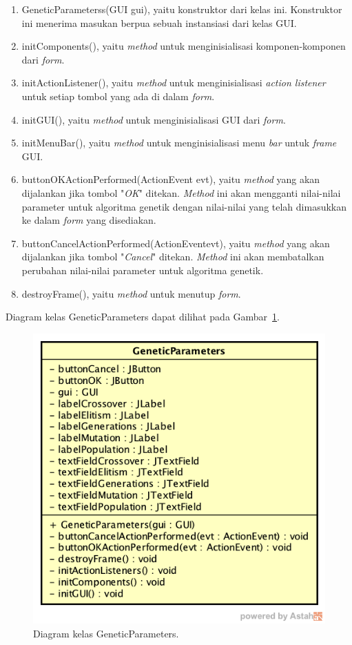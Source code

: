 \begin{enumerate}
\item GeneticParameterss(GUI gui), yaitu konstruktor dari kelas ini. Konstruktor ini menerima masukan berpua sebuah instansiasi dari kelas GUI.
\item initComponents(), yaitu \textit{method} untuk menginisialisasi komponen-komponen dari \textit{form}.
\item initActionListener(), yaitu \textit{method} untuk menginisialisasi \textit{action listener} untuk setiap tombol yang ada di dalam \textit{form}.
\item initGUI(), yaitu \textit{method} untuk menginisialisasi GUI dari \textit{form}.
\item initMenuBar(), yaitu \textit{method} untuk menginisialisasi menu \textit{bar} untuk \textit{frame} GUI.
\item buttonOKActionPerformed(ActionEvent evt), yaitu \textit{method} yang akan dijalankan jika tombol "\textit{OK}" ditekan. \textit{Method} ini akan mengganti nilai-nilai parameter untuk algoritma genetik dengan nilai-nilai yang telah dimasukkan ke dalam \textit{form} yang disediakan.
\item buttonCancelActionPerformed(ActionEventevt), yaitu \textit{method} yang akan dijalankan jika tombol "\textit{Cancel}" ditekan. \textit{Method} ini akan membatalkan perubahan nilai-nilai parameter untuk algoritma genetik.
\item destroyFrame(), yaitu \textit{method} untuk menutup \textit{form}.
\end{enumerate}

Diagram kelas GeneticParameters dapat dilihat pada Gambar~\ref{fig:diagramkelasgeneticparameters}.

\begin{figure}
\centering
\captionsetup{justification=centering}
\includegraphics[scale=0.5]{Gambar/Perancangan/DiagramKelasGeneticParameters.png}
\caption[Diagram kelas GeneticParameters.]{Diagram kelas GeneticParameters.}
\label{fig:diagramkelasgeneticparameters}
\end{figure}